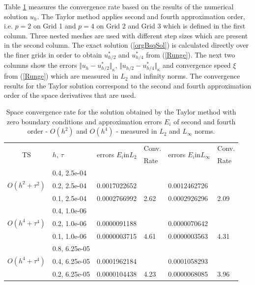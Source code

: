 \documentclass[%
 aip,
cp,  
 amsmath,amssymb,
 reprint,
]{iopconfser}
\newcommand{\rf}[1]{(\ref{#1})}
\begin{document}
Table \ref{tableA} measures the convergence rate based on the results of the numerical solution $u_h$. The Taylor method applies second and fourth approximation order, i.e. $p=2$ on Grid 1 and $p=4$ on Grid 2 and Grid 3 which is defined in the first column. 
 Three nested meshes are used with different step sizes which are present in the second column. The exact solution \rf{orgBsqSol} is calculated directly over the finer grids in order to obtain $u^*_{h/2}$ and $u^*_{h/4}$ from \rf{Runge}. The next two columns show the errors $\Vert u_{h} - u^*_{h/2} \Vert_\kappa$, $\Vert  u_{h/2} - u^*_{h/4} \Vert_\kappa$ and convergence speed $\xi$ from \rf{Runge} which are measured in $L_2$ and infinity norms. The convergence results for the Taylor solution correspond to the second and fourth approximation order of the space derivatives that are used. 
\begin{table}[ht]
\centering
\small
		\begin{tabular}{||c|l|ll|ll||}
			\hline
			\hline
      \multirow{2  }{*}{TS}        & \multirow{2  }{*}{$h$, $\tau$}  & \multirow{2  }{*}{errors $E_i$in$L_2$}  &Conv.& \multirow{2  }{*}{errors $E_i$in$L_\infty$}  &Conv.  \\
	         &                    &                               & Rate   &                                        & Rate \\
   			\hline 
					\hline 
                                    &0.4, 2.5e-04          &              &              &                     &      \\
      $O(h^2 + \tau^ 2)$ &0.2, 2.5e-04          &0.0017022652 &            &0.0012462726    &       \\
                                   &0.1, 2.5e-04   & 0.0002766992 & 2.62    &0.0002926296    &  2.09      \\
			\hline 
                                  &0.4, 1.0e-06        &             &            &           &   \\
   $O(h^4+ \tau^4)$   &0.2, 1.0e-06       &  0.0000091188  &            &0.0000070642 &   \\
                                  &0.1, 1.0e-06  &0.0000003715   &4.61  &0.0000003563  & 4.31 \\
			\hline
                                 &0.8, 6.25e-05    &            &               &             &    \\
 $O(h^4+ \tau^4)$    &0.4, 6.25e-05     & 0.0001962184   &        &  0.0001058293   &   \\
                                &0.2, 6.25e-05   &0.0000104438 & 4.23  & 0.0000068085  & 3.96  \\
    \hline
			\hline 
		\end{tabular}
		\caption{Space convergence rate for the solution obtained by the Taylor method with zero boundary conditions and approximation errors $E_i$ of second and fourth order - $O(h^{2})$ and $O(h^{4})$ - measured in $L_2$ and $L_\infty$ norms.}
\label{tableA}
\end{table}
\end{document}

